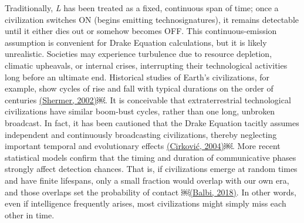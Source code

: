 Traditionally, \emph{L} has been treated as a fixed, continuous span of time; once a civilization switches ON (begins emitting technosignatures), it remains detectable until it either dies out or somehow becomes OFF. This continuous-emission assumption is convenient for Drake Equation calculations, but it is likely unrealistic. Societies may experience turbulence due to resource depletion, climatic upheavals, or internal crises, interrupting their technological activities long before an ultimate end. Historical studies of Earth's civilizations, for example, show cycles of rise and fall with typical durations on the order of centuries \href{https://paperpile.com/c/hQuIW4/pYHX}{(Shermer, 2002)}￼. It is conceivable that extraterrestrial technological civilizations have similar boom-bust cycles, rather than one long, unbroken broadcast. In fact, it has been cautioned that the Drake Equation tacitly assumes independent and continuously broadcasting civilizations, thereby neglecting important temporal and evolutionary effects \href{https://paperpile.com/c/hQuIW4/IJ88}{(Cirković, 2004)}￼. More recent statistical models confirm that the timing and duration of communicative phases strongly affect detection chances. That is, if civilizations emerge at random times and have finite lifespans, only a small fraction would overlap with our own era, and those overlaps set the probability of contact ￼\href{https://paperpile.com/c/hQuIW4/X9R2}{(Balbi, 2018)}. In other words, even if intelligence frequently arises, most civilizations might simply miss each other in time.

